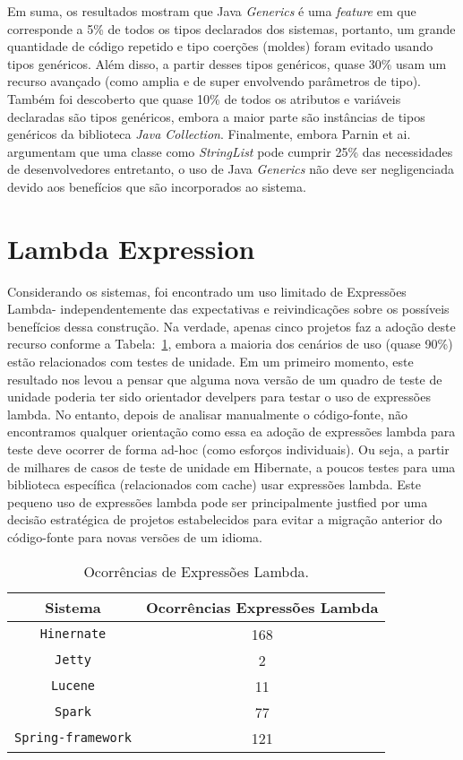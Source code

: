 Em suma, os resultados mostram que Java \textit{Generics} é uma \textit{feature} em que corresponde a 5\% de todos os tipos declarados dos sistemas, portanto, um grande quantidade de código repetido e tipo coerções (moldes) foram evitado usando tipos genéricos. Além disso, a partir desses tipos genéricos, quase 30\% usam um recurso avançado (como amplia e de super envolvendo parâmetros de tipo). Também foi descoberto que quase 10\% de todos os atributos e variáveis declaradas são tipos genéricos, embora a maior parte são instâncias de tipos genéricos da biblioteca \textit{Java Collection}. Finalmente, embora Parnin et ai.~\cite{Parnin:ACM2011} argumentam que uma classe como \textit{StringList} pode cumprir 25\% das necessidades de desenvolvedores entretanto, o uso de Java \textit{Generics}  não deve ser negligenciada devido aos benefícios que são incorporados ao sistema.



\section{Lambda Expression}
Considerando os sistemas, foi encontrado um uso limitado de Expressões Lambda- independentemente das expectativas e reivindicações sobre os possíveis benefícios dessa construção. Na verdade, apenas cinco projetos faz a adoção deste recurso conforme a Tabela:~\ref{tab:adocaoLambda}, embora a maioria dos cenários de uso (quase 90\%) estão relacionados com testes de unidade. Em um primeiro momento, este resultado nos levou a pensar que alguma nova versão de um quadro de teste de unidade poderia ter sido orientador develpers para testar o uso de expressões lambda. No entanto, depois de analisar manualmente o código-fonte, não encontramos qualquer orientação como essa ea adoção de expressões lambda para teste deve ocorrer de forma ad-hoc (como esforços individuais). Ou seja, a partir de milhares de casos de teste de unidade em Hibernate, a poucos testes para uma biblioteca específica (relacionados com cache) usar expressões lambda. Este pequeno uso de expressões lambda pode ser principalmente justfied por uma decisão estratégica de projetos estabelecidos para evitar a migração anterior do código-fonte para novas versões de um idioma.

\begin{table}[h]
	\centering
	\caption{Ocorrências de Expressões Lambda.}
	\begin{tabular}{cc}
		\hline
		Sistema & Ocorrências Expressões Lambda\\ 
		\hline \hline
		\texttt{Hinernate} & 168 \\ 
		\texttt{Jetty} & 2 \\ 
		\texttt{Lucene} & 11 \\ 
		\texttt{Spark} & 77 \\ 
		\texttt{Spring-framework} & 121 \\ \hline
	\end{tabular}
	\label{tab:adocaoLambda} %
\end{table}


